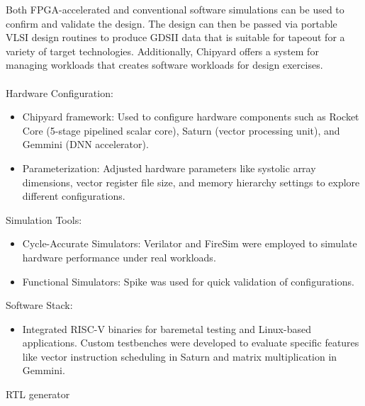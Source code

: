 \documentclass[conference]{IEEEtran}
\begin{document}
Both FPGA-accelerated and conventional software simulations can be used to confirm and validate the design. The design can then be passed via portable VLSI design routines to produce GDSII data that is suitable for tapeout for a variety of target technologies. Additionally, Chipyard offers a system for managing workloads that creates software workloads for design exercises.
\\\\
Hardware Configuration:
\begin{itemize}
    \item Chipyard framework: Used to configure hardware components such as Rocket Core (5-stage pipelined scalar core), Saturn (vector processing unit), and Gemmini (DNN accelerator).
\end{itemize}
\begin{itemize}
    \item Parameterization: Adjusted hardware parameters like systolic array dimensions, vector register file size, and memory hierarchy settings to explore different configurations.
\end{itemize}
Simulation Tools:
\begin{itemize}
    \item Cycle-Accurate Simulators: Verilator and FireSim were employed to simulate hardware performance under real workloads.
\end{itemize}
\begin{itemize}
    \item Functional Simulators: Spike was used for quick validation of configurations.
\end{itemize}
Software Stack:
\begin{itemize}
    \item Integrated RISC-V binaries for baremetal testing and Linux-based applications. Custom testbenches were developed to evaluate specific features like vector instruction scheduling in Saturn and matrix multiplication in Gemmini.
\end{itemize}

RTL generator
\end{document}
